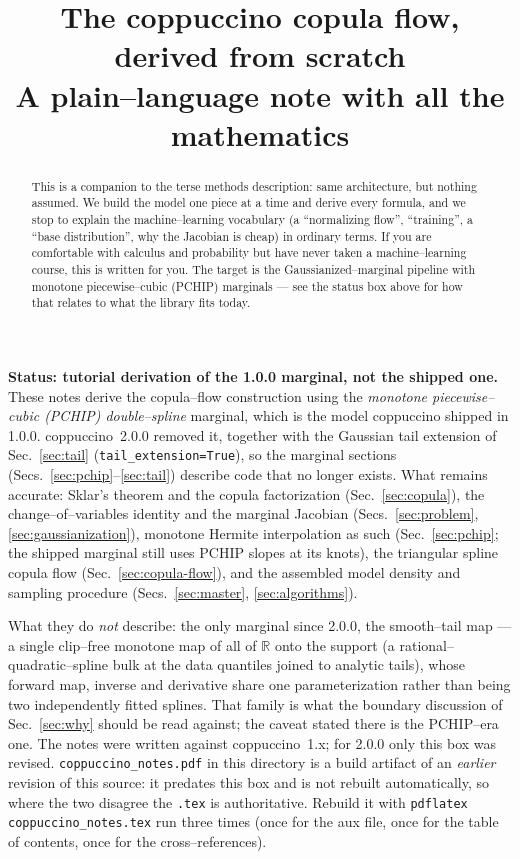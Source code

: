 \documentclass[11pt]{article}
\title{\textbf{The coppuccino copula flow, derived from scratch}\\[2pt]
\large A plain--language note with all the mathematics}
\author{}
\date{}
\newcommand{\R}{\mathbb{R}}
\theoremstyle{remark}
\begin{document}
\maketitle

\begin{framed}
\noindent
\textbf{Status: tutorial derivation of the 1.0.0 marginal, not the shipped one.}
These notes derive the copula--flow construction using the
\emph{monotone piecewise--cubic (PCHIP) double--spline} marginal, which is the
model coppuccino shipped in 1.0.0. coppuccino~2.0.0 removed it, together with
the Gaussian tail extension of Sec.~\ref{sec:tail} (\texttt{tail\_extension=True}),
so the marginal sections (Secs.~\ref{sec:pchip}--\ref{sec:tail}) describe code
that no longer exists. What remains accurate:
Sklar's theorem and the copula factorization (Sec.~\ref{sec:copula}), the
change--of--variables identity and the marginal Jacobian
(Secs.~\ref{sec:problem}, \ref{sec:gaussianization}), monotone Hermite
interpolation as such (Sec.~\ref{sec:pchip}; the shipped marginal still uses
PCHIP slopes at its knots), the triangular spline copula flow
(Sec.~\ref{sec:copula-flow}), and the assembled model density and sampling
procedure (Secs.~\ref{sec:master}, \ref{sec:algorithms}).

\medskip\noindent
What they do \emph{not} describe: the only marginal since 2.0.0, the
smooth--tail map --- a single clip--free monotone map of all of
$\R$ onto the support (a rational--quadratic--spline bulk at the data quantiles
joined to analytic tails), whose forward map, inverse and derivative share one
parameterization rather than being two independently fitted splines. That
family is what the boundary discussion of Sec.~\ref{sec:why} should be read
against; the caveat stated there is the PCHIP--era one. The notes were written
against coppuccino~1.x; for 2.0.0 only this box was revised.
\texttt{coppuccino\_notes.pdf} in this directory is a build
artifact of an \emph{earlier} revision of this source: it predates this box and
is not rebuilt automatically, so where the two disagree the \texttt{.tex} is
authoritative. Rebuild it with
\texttt{pdflatex coppuccino\_notes.tex} run three times (once for the aux file,
once for the table of contents, once for the cross--references).
\end{framed}

\begin{abstract}
\noindent
This is a companion to the terse methods description: same architecture, but
nothing assumed. We build the model one piece at a time and derive every formula,
and we stop to explain the machine--learning vocabulary (a ``normalizing flow'',
``training'', a ``base distribution'', why the Jacobian is cheap) in ordinary
terms. If you are comfortable with calculus and probability but have never taken
a machine--learning course, this is written for you. The target is the
Gaussianized--marginal pipeline with monotone piecewise--cubic (PCHIP)
marginals --- see the status box above for how that relates to what the library
fits today.
\end{abstract}
\end{document}
